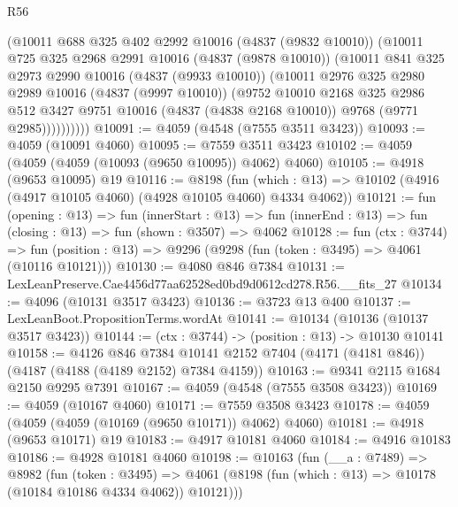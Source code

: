 \begin{lexlean}{R56}
\begin{coremodule}
            (@10011
              @688
              @325
              @402
              @2992
              @10016
              (@4837 (@9832 @10010))
              (@10011
                @725
                @325
                @2968
                @2991
                @10016
                (@4837 (@9878 @10010))
                (@10011
                  @841
                  @325
                  @2973
                  @2990
                  @10016
                  (@4837 (@9933 @10010))
                  (@10011
                    @2976
                    @325
                    @2980
                    @2989
                    @10016
                    (@4837 (@9997 @10010))
                    (@9752
                      @10010
                      @2168
                      @325
                      @2986
                      @512
                      @3427
                      @9751
                      @10016
                      (@4837 (@4838 @2168 @10010))
                      @9768
                      (@9771 @2985))))))))))
@10091 := @4059 (@4548 (@7555 @3511 @3423))
@10093 := @4059 (@10091 @4060)
@10095 := @7559 @3511 @3423
@10102 := @4059 (@4059 (@4059 (@10093 (@9650 @10095)) @4062) @4060)
@10105 := @4918 (@9653 @10095) @19
@10116 := @8198
    (fun (which : @13) => @10102 (@4916 (@4917 @10105 @4060) (@4928 @10105 @4060) @4334 @4062))
@10121 := fun (opening : @13) =>
  fun (innerStart : @13) =>
  fun (innerEnd : @13) => fun (closing : @13) => fun (shown : @3507) => @4062
@10128 := fun (ctx : @3744) =>
  fun (position : @13) => @9296 (@9298 (fun (token : @3495) => @4061 (@10116 @10121)))
@10130 := @4080 @846 @7384
@10131 := LexLeanPreserve.Cae4456d77aa62528ed0bd9d0612cd278.R56.__fits_27
@10134 := @4096 (@10131 @3517 @3423)
@10136 := @3723 @13 @400
@10137 := LexLeanBoot.PropositionTerms.wordAt
@10141 := @10134 (@10136 (@10137 @3517 @3423))
@10144 := (ctx : @3744) -> (position : @13) -> @10130 @10141
@10158 := @4126
    @846
    @7384
    @10141
    @2152
    @7404
    (@4171 (@4181 @846))
    (@4187 (@4188 (@4189 @2152) @7384 @4159))
@10163 := @9341 @2115 @1684 @2150 @9295 @7391
@10167 := @4059 (@4548 (@7555 @3508 @3423))
@10169 := @4059 (@10167 @4060)
@10171 := @7559 @3508 @3423
@10178 := @4059 (@4059 (@4059 (@10169 (@9650 @10171)) @4062) @4060)
@10181 := @4918 (@9653 @10171) @19
@10183 := @4917 @10181 @4060
@10184 := @4916 @10183
@10186 := @4928 @10181 @4060
@10198 := @10163
    (fun (__a : @7489) =>
    @8982
      (fun (token : @3495) =>
      @4061 (@8198 (fun (which : @13) => @10178 (@10184 @10186 @4334 @4062)) @10121)))

\end{coremodule}
\end{lexlean}
